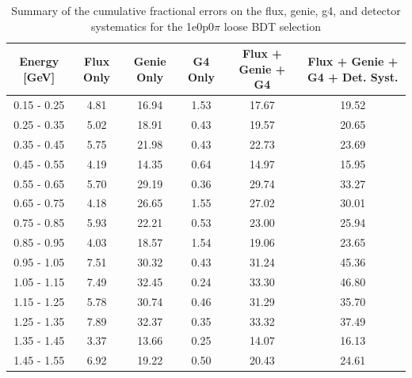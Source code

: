 \begin{table}[H]
\centering
\begin{tabular}{| c | c | c | c | c | c |}
\hline
Energy [GeV] & Flux Only & Genie Only  & G4 Only & Flux + Genie + G4 & Flux + Genie + G4 + Det. Syst. \\
\hline
0.15 - 0.25 & 4.81 & 16.94 & 1.53 & 17.67 & 19.52 \\
0.25 - 0.35 & 5.02 & 18.91 & 0.43 & 19.57 & 20.65 \\
0.35 - 0.45 & 5.75 & 21.98 & 0.43 & 22.73 & 23.69 \\
0.45 - 0.55 & 4.19 & 14.35 & 0.64 & 14.97 & 15.95 \\
0.55 - 0.65 & 5.70 & 29.19 & 0.36 & 29.74 & 33.27 \\
0.65 - 0.75 & 4.18 & 26.65 & 1.55 & 27.02 & 30.01 \\
0.75 - 0.85 & 5.93 & 22.21 & 0.53 & 23.00 & 25.94 \\
0.85 - 0.95 & 4.03 & 18.57 & 1.54 & 19.06 & 23.65 \\
0.95 - 1.05 & 7.51 & 30.32 & 0.43 & 31.24 & 45.36 \\
1.05 - 1.15 & 7.49 & 32.45 & 0.24 & 33.30 & 46.80 \\
1.15 - 1.25 & 5.78 & 30.74 & 0.46 & 31.29 & 35.70 \\
1.25 - 1.35 & 7.89 & 32.37 & 0.35 & 33.32 & 37.49 \\
1.35 - 1.45 & 3.37 & 13.66 & 0.25 & 14.07 & 16.13 \\
1.45 - 1.55 & 6.92 & 19.22 & 0.50 & 20.43 & 24.61 \\
\hline
\end{tabular}
\caption{Summary of the cumulative fractional errors on the flux, genie, g4, and detector systematics for the 1e0p0$\pi$ loose BDT selection}
\label{tab:1e0p0pi_bdtloose_errors}
\end{table}

